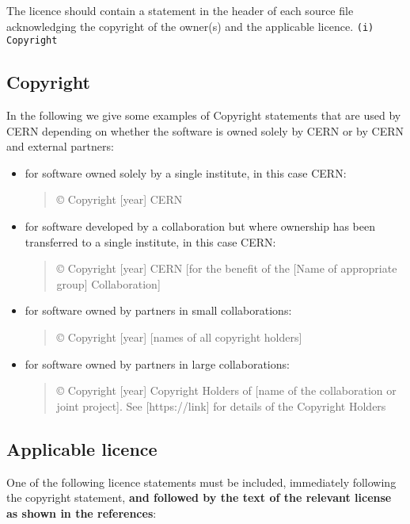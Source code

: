 \documentclass[12pt,a4paper]{article}
\begin{document}
The licence should contain a statement in the header of each source file acknowledging the copyright of the owner(s) and the applicable licence.
\newline\verb?(i)	Copyright?

\subsection{Copyright}
\label{sec:CopyrightExamples}

In the following we give some examples of Copyright statements that are used by CERN depending on whether the software is owned solely by CERN or by CERN and external partners:
\begin{itemize}
\item for software owned solely by a single institute, in this case CERN:
\begin{quote}
© Copyright [year] CERN
\end{quote}
\item for software developed by a collaboration but where ownership has been transferred to a single institute, in this case CERN:
\begin{quote}
© Copyright [year] CERN [for the benefit of the [Name of appropriate group] Collaboration]
\end{quote}
\item for software owned by partners in small collaborations:
\begin{quote}
© Copyright [year] [names of all copyright holders]
\end{quote}
\item for software owned by partners in large collaborations:
\begin{quote}
© Copyright [year] Copyright Holders of [name of the collaboration or joint project]. See [https://link] for details of the Copyright Holders
\end{quote}
\end{itemize}

\subsection{Applicable licence}
\label{sec:ApplicableLicenceExamples}

One of the following licence statements must be included, immediately following the copyright statement, \textbf{and followed by the text of the relevant license as shown in the references}:
\end{document}
